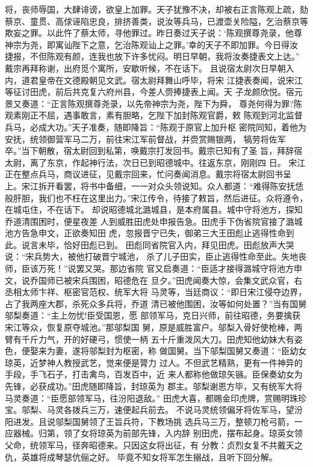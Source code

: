 将，丧师辱国，大肆诽谤，欲皇上加罪。天子犹豫不决，却被右正言陈观上疏，劾
蔡京、童贯、高俅诬陷忠良，排挤善类，说汝等兵马，已渡壶关险隘，乞治蔡京等
欺妄之罪。以此忤了蔡太师，寻他罪过。昨日奏过天子说：‘陈观撰尊尧录，他尊
神宗为尧，即寓讪陛下之意，乞治陈观讪上之罪。’幸的天子不即加罪。今日得汝
捷报，不但陈观有颜，连我也放下许多忧闷。明日早朝，我将汝奏捷表文上达。”
戴宗再拜称谢，出府觅个寓所，安歇听候，不在话下。
且说宿太尉次日早朝入内，道君皇帝在文德殿朝见文武。宿太尉拜舞山呼毕，将宋
江捷表奏闻，说宋江等征讨田虎，前后共克复六府州县，今差人赍捧捷表上闻。天
子龙颜欣悦。宿元景又奏道：“正言陈观撰尊尧录，以先帝神宗为尧，陛下为舜，
尊尧何得为罪?陈观素刚正不屈，遇事敢言，素有胆略，乞陛下加封陈观官爵，敕
陈观到河北监督兵马，必成大功。”天子准奏，随即降旨：“陈观于原官上加升枢
密院同知，着他为安抚，统领御营军马二万，前往宋江军前督战，并赍赏赐银两，
犒劳将佐军卒。”当下朝散，宿太尉回到私第，唤戴宗打发回书。戴宗已知有了圣
旨，拜辞宿太尉，离了东京，作起神行法，次日已到昭德城中。往返东京，刚刚四
日。
宋江正在整点兵马，商议进征，见戴宗回来，忙问奏闻消息。戴宗将宿太尉回书呈
上。宋江拆开看罢，将书中备细，一一对众头领说知。众人都道：“难得陈安抚恁
般肝胆，我们也不枉在这里出力。”宋江传令，待接了敕旨，然后进征。众将遵令，
在城屯住，不在话下。
却说昭德城北潞城县，是本府属县。城中守将池方，探知乔道清围困时，便星夜差
人到威胜田虎处申报告急。田虎手下伪省院官接了潞城池方告急申文，正欲奏知田
虎，忽报晋宁已失，御弟三大王田彪止逃得性命到此。说言未毕，恰好田彪已到。
田彪同省院官入内，拜见田虎。田彪放声大哭说：“宋兵势大，被他打破晋宁城池，
杀了儿子田实，臣止逃得性命至此。失地丧师，臣该万死！”说罢又哭。那边省院
官又启奏道：“臣适才接得潞城守将池方申文，说乔国师已被宋兵围困，昭德危在
旦夕。”田虎闻奏大惊，会集文武众官，右丞相太师卞祥、枢密官范权、统军大将
马灵等，当廷商议：“即日宋江侵夺边界，占了我两座大郡，杀死众多兵将，乔道
清已被他围困，汝等如何处置？”当有国舅邬梨奏道：“主上勿忧!臣受国恩，愿
部领军马，克日兴师，前往昭德，务要擒获宋江等众，恢复原夺城池。”那邬梨国
舅，原是威胜富户。邬梨入骨好使枪棒，两臂有千斤力气，开的好硬弓，惯使一柄
五十斤重泼风大刀。田虎知他幼妹大有姿色，便娶来为妻，遂将邬梨封为枢密，称
做国舅。当下邬梨国舅又奏道：“臣幼女琼英，近梦神人教授武艺，觉来便是膂力
过人。不但武艺精熟，更有一件神异的手段，手飞石子，打击禽鸟，百发百中，近
来人都称他做琼矢镞。臣保奏幼女为先锋，必获成功。”田虎随即降旨，封琼英为
郡主。邬梨谢恩方毕，又有统军大将马灵奏道：“臣愿部领军马，往汾阳退敌。”
田虎大喜，都赐金印虎牌，赏赐明珠珍宝。邬梨、马灵各拨兵三万，速便起兵前去。
不说马灵统领偏牙将佐军马，望汾阳进发。且说邬梨国舅领了王旨兵符，下教场挑
选兵马三万，整顿刀枪弓箭，一应器械。归第，领了女将琼英为前部先锋，入内辞
别田虎，摆布起身。琼英女领父命，统领军马，径奔昭德来。只因这女将出征，有
分教：贞烈女复不共戴天之仇，英雄将成琴瑟伉俪之好。
毕竟不知女将军怎生搦战，且听下回分解。